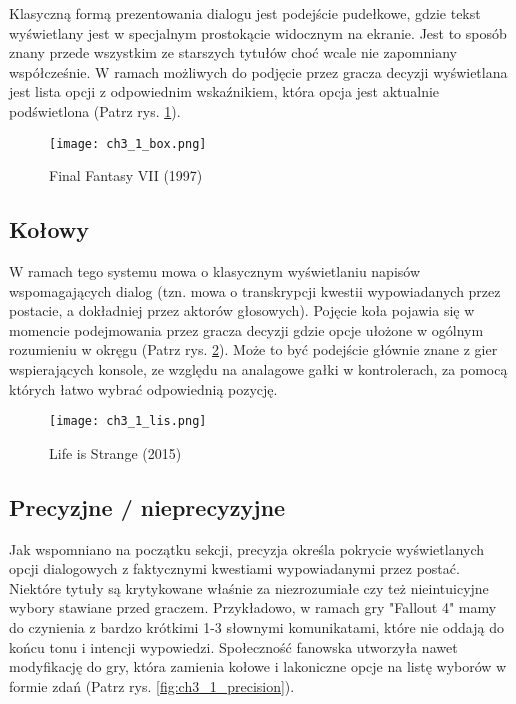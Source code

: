 Klasyczną formą prezentowania dialogu jest podejście pudełkowe, gdzie tekst wyświetlany jest w
specjalnym prostokącie widocznym na ekranie. Jest to sposób znany przede wszystkim ze starszych
tytułów choć wcale nie zapomniany współcześnie. W ramach możliwych do podjęcie przez gracza
decyzji wyświetlana jest lista opcji z odpowiednim wskaźnikiem, która opcja jest aktualnie
podświetlona (Patrz rys. \ref{fig:ch3_1_box}).

\begin{figure}[h]
    \texttt{[image: ch3\_1\_box.png]}
    \caption{Final Fantasy VII (1997)}
    \centering
    \label{fig:ch3_1_box}
\end{figure}

\newpage

\subsection{Kołowy}

W ramach tego systemu mowa o klasycznym wyświetlaniu napisów wspomagających dialog (tzn. mowa o
transkrypcji kwestii wypowiadanych przez postacie, a dokładniej przez aktorów głosowych). Pojęcie
koła pojawia się w momencie podejmowania przez gracza decyzji gdzie opcje ułożone w ogólnym
rozumieniu w okręgu (Patrz rys. \ref{fig:ch3_1_wheel}). Może to być podejście głównie znane
z gier wspierających konsole, ze względu na analagowe gałki w kontrolerach, za pomocą których
łatwo wybrać odpowiednią pozycję.

\begin{figure}[h]
    \centering
    \texttt{[image: ch3\_1\_lis.png]}
    \caption{Life is Strange (2015)}
    \label{fig:ch3_1_wheel}
\end{figure}

\newpage

\subsection{Precyzjne / nieprecyzyjne}\label{subsubsection:ch3_1_precision}

Jak wspomniano na początku sekcji, precyzja określa pokrycie wyświetlanych opcji dialogowych z
faktycznymi kwestiami wypowiadanymi przez postać. Niektóre tytuły są krytykowane właśnie za
niezrozumiałe czy też nieintuicyjne wybory stawiane przed graczem. Przykładowo, w ramach gry
"Fallout 4" mamy do czynienia z bardzo krótkimi 1-3 słownymi komunikatami, które nie oddają
do końcu tonu i intencji wypowiedzi. Społeczność fanowska utworzyła nawet modyfikację do gry,
która zamienia kołowe i lakoniczne opcje na listę wyborów w formie zdań
(Patrz rys. \ref{fig:ch3_1_precision}).

